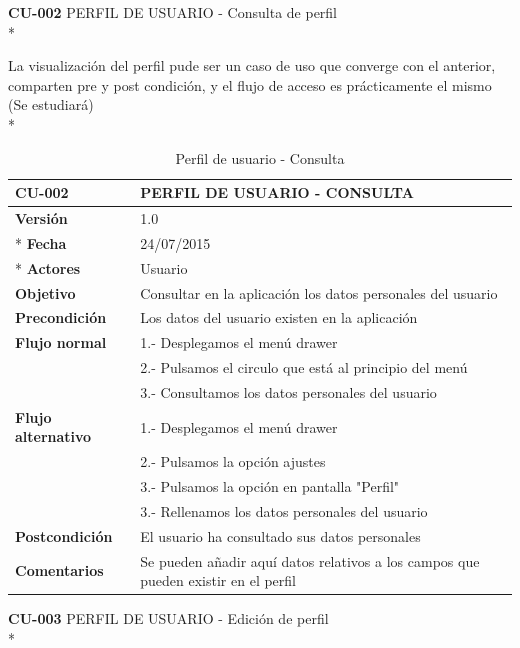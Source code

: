\documentclass[../pfc.tex]{subfiles}
\begin{document}
	
	
	\textbf{CU-002}	PERFIL DE USUARIO - Consulta de perfil\\*
	
	La visualización del perfil pude ser un caso de uso que converge con el anterior, comparten pre y post condición, y el flujo de acceso es prácticamente el mismo (Se estudiará)\\*
	
	\begin{table}[H]
		\centering
		\begin{tabular}[t]{|p{3cm}|p{9.5cm}|}
			\hline \textbf{CU-002} & \textbf{PERFIL DE USUARIO - CONSULTA} \\*
			\hline\hline \textbf{Versión} & 1.0 \\ *
			\hline\hline \textbf{Fecha} & 24/07/2015 \\ *
			\hline\textbf{Actores} 	& Usuario\\*
			\hline \textbf{Objetivo} & Consultar en la aplicación los datos personales del usuario\\* 			
			\hline \textbf{Precondición} & Los datos del usuario existen en la aplicación \\* 
			\hline \textbf{Flujo normal} & 1.- Desplegamos el menú drawer \\* 
			& 2.- Pulsamos el circulo que está al principio del menú \\*	
			& 3.- Consultamos los datos personales del usuario\\*	
			\hline \textbf{Flujo alternativo} & 1.- Desplegamos el menú drawer \\* 
			& 2.- Pulsamos la opción ajustes \\*	
			& 3.- Pulsamos la opción en pantalla "Perfil" \\*	
			& 3.- Rellenamos los datos personales del usuario \\*	
			\hline \textbf{Postcondición} & El usuario ha consultado sus datos personales\\* 
			\hline \textbf{Comentarios}   & Se pueden añadir aquí datos relativos a los campos que pueden existir en el perfil\\*
			\hline
		\end{tabular}
		\caption{Perfil de usuario - Consulta}
		\label{tabla:caso002}
	\end{table}
	
		
	\textbf{CU-003} PERFIL DE USUARIO - Edición de perfil\\*
	
\end{document}
